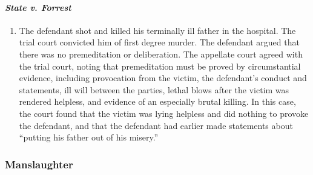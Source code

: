 \paragraph{\emph{State v. Forrest}}

\begin{enumerate}
    \item The defendant shot and killed his terminally ill father in the hospital. The trial court convicted him of first degree murder. The defendant argued that there was no premeditation or deliberation. The appellate court agreed with the trial court, noting that premeditation must be proved by circumstantial evidence, including provocation from the victim, the defendant's conduct and statements, ill will between the parties, lethal blows after the victim was rendered helpless, and evidence of an especially brutal killing. In this case, the court found that the victim was lying helpless and did nothing to provoke the defendant, and that the defendant had earlier made statements about ``putting his father out of his misery.''
\end{enumerate}

\subsubsection{Manslaughter}

